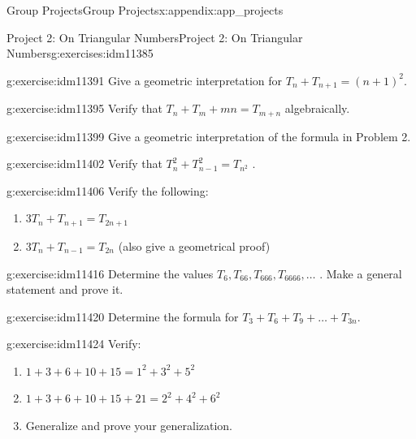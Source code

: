 \documentclass[oneside,10pt,]{book}
\numberwithin{equation}{chapter}
\begin{document}
\begin{appendixptx}{Group Projects}{}{Group Projects}{}{}{x:appendix:app_projects}
\begin{exercises-section-numberless}{Project 2: On Triangular Numbers}{}{Project 2: On Triangular Numbers}{}{}{g:exercises:idm11385}
\begin{divisionexercise}{1}{}{}{g:exercise:idm11391}
Give a geometric interpretation for \(T_{n} + T_{n + 1} = \left( n + 1 \right)^{2}.\)%
\end{divisionexercise}%
\begin{divisionexercise}{2}{}{}{g:exercise:idm11395}%
Verify that \(T_{n} + T_{m} + mn = T_{m + n}\) algebraically.%
\end{divisionexercise}%
\begin{divisionexercise}{3}{}{}{g:exercise:idm11399}%
Give a geometric interpretation of the formula in Problem 2.%
\end{divisionexercise}%
\begin{divisionexercise}{4}{}{}{g:exercise:idm11402}%
Verify that \(T_{n}^{2} + T_{n - 1}^{2} = T_{n^{2}}\) .%
\end{divisionexercise}%
\begin{divisionexercise}{5}{}{}{g:exercise:idm11406}%
Verify the following:%
\begin{enumerate}[label=(\alph*)]
\item{}\(3T_{n} + T_{n + 1} = T_{2n + 1}\)%
\item{}\(3T_{n} + T_{n - 1} = T_{2n}\) (also give a geometrical proof)%
\end{enumerate}
%
\end{divisionexercise}%
\begin{divisionexercise}{6}{}{}{g:exercise:idm11416}%
Determine the values \(T_{6},T_{66},T_{666},T_{6666},\ldots\) . Make a general statement and prove it.%
\end{divisionexercise}%
\begin{divisionexercise}{7}{}{}{g:exercise:idm11420}%
Determine the formula for \(T_{3} + T_{6} + T_{9} + \ldots + T_{3n}.\)%
\end{divisionexercise}%
\begin{divisionexercise}{8}{}{}{g:exercise:idm11424}%
Verify:%
\begin{enumerate}[label=(\alph*)]
\item{}\(1 + 3 + 6 + 10 + 15 = 1^{2} + 3^{2} + 5^{2}\)%
\item{}\(1 + 3 + 6 + 10 + 15 + 21 = 2^{2} + 4^{2} + 6^{2}\)%
\item{}Generalize and prove your generalization.%
\end{enumerate}
%
\end{divisionexercise}%
\end{exercises-section-numberless}
%
%
\typeout{************************************************}
\typeout{************************************************}

\end{appendixptx}
\end{document}
